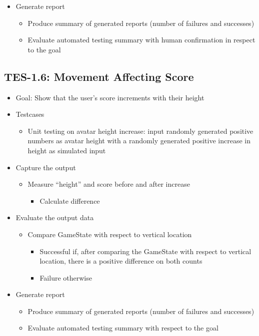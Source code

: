 \begin{itemize}
\item Generate report
\begin{itemize}
\item Produce summary of generated reports (number of failures and successes)
\item Evaluate automated testing summary with human confirmation in respect to the goal
\end{itemize}
\end{itemize}

\subsection{TES-1.6: Movement Affecting Score}
\label{subsec:movescore}
\begin{itemize}
\item Goal: Show that the user\textquoteright{}s score increments with their height

\item Testcases
\begin{itemize}
\item Unit testing on avatar height increase: input randomly generated positive numbers as avatar height with a randomly generated positive increase in height as simulated input
\end{itemize}

\item Capture the output
\begin{itemize}
\item Measure “height” and score before and after increase
\begin{itemize}
\item Calculate difference
\end{itemize}
\end{itemize}

\item Evaluate the output data
\begin{itemize}
\item Compare GameState with respect to vertical location
\begin{itemize}
\item Successful if, after comparing the GameState with respect to vertical location, there is a positive difference on both counts
\item Failure otherwise
\end{itemize}
\end{itemize}

\item Generate report
\begin{itemize}
\item Produce summary of generated reports (number of failures and successes)
\item Evaluate automated testing summary with respect to the goal
\end{itemize}
\end{itemize}

